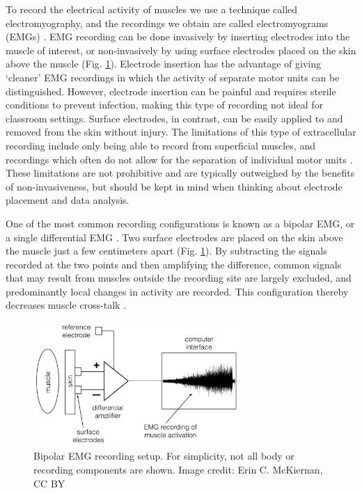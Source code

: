 \documentclass[12pt]{article}
\begin{document}
To record the electrical activity of muscles we use a technique called electromyography, and the recordings we obtain are called electromyograms (EMGs) \cite{garcia2011surface}. EMG recording can be done invasively by inserting electrodes into the muscle of interest, or non-invasively by using surface electrodes placed on the skin above the muscle (Fig. \ref{fig:emg}). Electrode insertion has the advantage of giving `cleaner' EMG recordings in which the activity of separate motor units can be distinguished. However, electrode insertion can be painful and requires sterile conditions to prevent infection, making this type of recording not ideal for classroom settings. Surface electrodes, in contrast, can be easily applied to and removed from the skin without injury. The limitations of this type of extracellular recording include only being able to record from superficial muscles, and recordings which often do not allow for the separation of individual motor units \cite{garcia2011surface}. These limitations are not prohibitive and are typically outweighed by the benefits of non-invasiveness, but should be kept in mind when thinking about electrode placement and data analysis. 

One of the most common recording configurations is known as a bipolar EMG, or a single differential EMG \cite{garcia2011surface}. Two surface electrodes are placed on the skin above the muscle just a few centimeters apart (Fig. \ref{fig:emg}). By subtracting the signals recorded at the two points and then amplifying the difference, common signals that may result from muscles outside the recording site are largely excluded, and predominantly local changes in activity are recorded. This configuration thereby decreases muscle cross-talk \cite{garcia2011surface}. 

\begin{figure}[h!]
\centering
\includegraphics[width=0.7\textwidth]{figures/emgAmp.png}
\caption{Bipolar EMG recording setup. For simplicity, not all body or recording components are shown. Image credit: Erin C. McKiernan, CC BY}
\label{fig:emg}
\end{figure}
\end{document}
